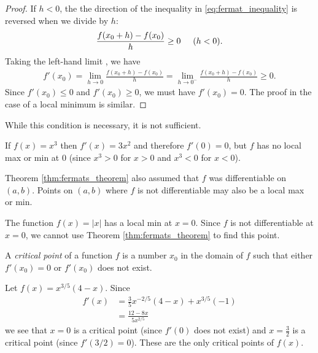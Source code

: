 \documentclass[12pt,letterpaper,reqno]{article}
\numberwithin{equation}{section}
\newcommand{\fixme}[1]{{\color{orange}{[#1]}}}
\begin{document}
{\begin{proof}
	If $h<0$, the the direction of the inequality in \eqref{eq:fermat_inequality} is reversed when we divide by $h$:
	\begin{align*}
		\frac{f(x_0+h)-f(x_0)}{h} \geq 0 \hspace{0.5cm} (h<0).
	\end{align*}
	Taking the left-hand limit \fixme{Justify this.}, we have
	\begin{align*}
		f'(x_0)=\lim_{h \to 0}\frac{f(x_0+h)-f(x_0)}{h}=\lim_{h \to 0^-}\frac{f(x_0+h)-f(x_0)}{h}\geq 0.
	\end{align*}
	Since $f'(x_0) \leq 0$ and $f'(x_0)\geq 0$, we must have $f'(x_0)=0$. The proof in the case of a local minimum is similar.
\end{proof}

While this condition is necessary, it is not sufficient.
\begin{example}
If $f(x)=x^3$ then $f'(x)=3x^2$ and therefore $f'(0)=0$, but $f$ has no local max or min at $0$ (since $x^3>0$ for $x>0$ and $x^3<0$ for $x<0$).	
\end{example}

Theorem \ref{thm:fermats_theorem} also assumed that $f$ was differentiable on $(a,b)$. Points on $(a,b)$ where $f$ is not differentiable may also be a local max or min.

\begin{example}
The function $f(x)=|x|$ has a local min at $x=0$. Since $f$ is not differentiable at $x=0$, we cannot use Theorem \ref{thm:fermats_theorem} to find this point.	
\end{example}

\begin{defn}
A \emph{critical point} of a function $f$ is a number $x_0$ in the domain of $f$ such that either $f'(x_0)=0$ or $f'(x_0)$ does not exist.	
\end{defn}

\begin{example}
Let $f(x)=x^{3/5}(4-x)$. Since
\begin{align*}
	f'(x)&=\frac{3}{5}x^{-2/5}(4-x)+x^{3/5}(-1) \\
	&=\frac{12-8x}{5x^{2/5}}
\end{align*}	
we see that $x=0$ is a critical point (since $f'(0)$ does not exist) and $x=\frac{3}{2}$ is a critical point (since $f'(3/2)=0$). These are the only critical points of $f(x)$.
\end{example}



}
\end{document}
